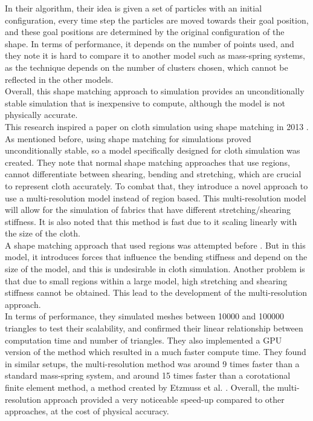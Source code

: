 \documentclass[12pt,a4paper]{article}
\begin{document}
In their algorithm, their idea is given a set of particles with an initial configuration, every time step the particles are moved towards their goal position, and these goal positions are determined by the original configuration of the shape. In terms of performance, it depends on the number of points used, and they note it is hard to compare it to another model such as mass-spring systems, as the technique depends on the number of clusters chosen, which cannot be reflected in the other models.\\
Overall, this shape matching approach to simulation provides an unconditionally stable simulation that is inexpensive to compute, although the model is not physically accurate.\\

This research inspired a paper on cloth simulation using shape matching in 2013 \cite{BENDER2013945}. As mentioned before, using shape matching for simulations proved unconditionally stable, so a model specifically designed for cloth simulation was created. They note that normal shape matching approaches that use regions, cannot differentiate between shearing, bending and stretching, which are crucial to represent cloth accurately. To combat that, they introduce a novel approach to use a multi-resolution model instead of region based. This multi-resolution model will allow for the simulation of fabrics that have different stretching/shearing stiffness. It is also noted that this method is fast due to it scaling linearly with the size of the cloth. \\

A shape matching approach that used regions was attempted before \cite{regionshapecloth}. But in this model, it introduces forces that influence the bending stiffness and depend on the size of the model, and this is undesirable in cloth simulation. Another problem is that due to small regions within a large model, high stretching and shearing stiffness cannot be obtained. This lead to the development of the multi-resolution approach.\\

In terms of performance, they simulated meshes between 10000 and 100000 triangles to test their scalability, and confirmed their linear relationship between computation time and number of triangles. They also implemented a GPU version of the method which resulted in a much faster compute time. They found in similar setups, the multi-resolution method was around 9 times faster than a standard mass-spring system, and around 15 times faster than a corotational finite element method, a method created by Etzmuss et al. \cite{etzmuss2003fast}. Overall, the multi-resolution approach provided a very noticeable speed-up compared to other approaches, at the cost of physical accuracy.
\end{document}
